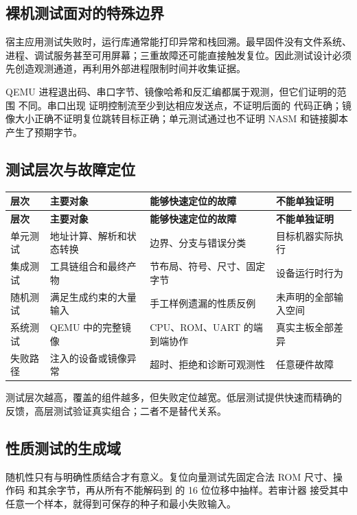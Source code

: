 \subsection{裸机测试面对的特殊边界}

宿主应用测试失败时，运行库通常能打印异常和栈回溯。最早固件没有文件系统、
进程、调试服务甚至可用屏幕；三重故障还可能直接触发复位。因此测试设计必须
先创造观测通道，再利用外部进程限制时间并收集证据。

QEMU 进程退出码、串口字节、镜像哈希和反汇编都属于观测，但它们证明的范围
不同。串口出现  证明控制流至少到达相应发送点，不证明后面的
代码正确；镜像大小正确不证明复位跳转目标正确；单元测试通过也不证明 NASM
和链接脚本产生了预期字节。

\subsection{测试层次与故障定位}

\begin{longtable}{L{0.16\textwidth}L{0.26\textwidth}L{0.25\textwidth}L{0.19\textwidth}}
\toprule
\textbf{层次} & \textbf{主要对象} & \textbf{能够快速定位的故障} & \textbf{不能单独证明}\\
\midrule
\endfirsthead
\toprule
\textbf{层次} & \textbf{主要对象} & \textbf{能够快速定位的故障} & \textbf{不能单独证明}\\
\midrule
\endhead
单元测试 & 地址计算、解析和状态转换 & 边界、分支与错误分类 & 目标机器实际执行\\
集成测试 & 工具链组合和最终产物 & 节布局、符号、尺寸、固定字节 & 设备运行时行为\\
随机测试 & 满足生成约束的大量输入 & 手工样例遗漏的性质反例 & 未声明的全部输入空间\\
系统测试 & QEMU 中的完整镜像 & CPU、ROM、UART 的端到端协作 & 真实主板全部差异\\
失败路径 & 注入的设备或镜像异常 & 超时、拒绝和诊断可观测性 & 任意硬件故障\\
\bottomrule
\end{longtable}

测试层次越高，覆盖的组件越多，但失败定位越宽。低层测试提供快速而精确的
反馈，高层测试验证真实组合；二者不是替代关系。

\subsection{性质测试的生成域}

随机性只有与明确性质结合才有意义。复位向量测试先固定合法 ROM 尺寸、操作码
和其余字节，再从所有不能解码到  的 16 位位移中抽样。若审计器
接受其中任意一个样本，就得到可保存的种子和最小失败输入。

